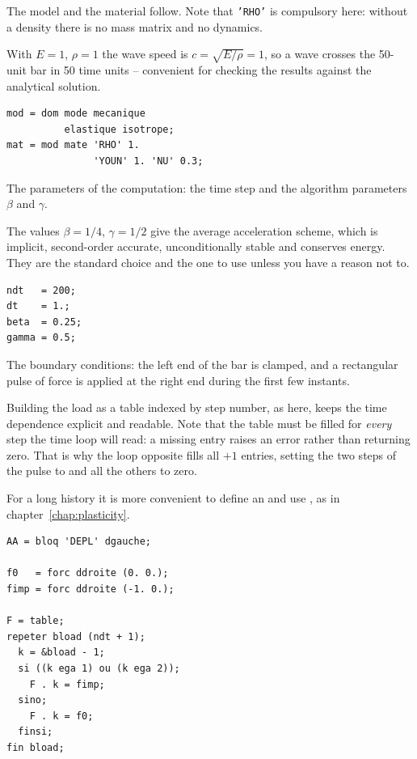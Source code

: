 \begin{castemcom}
The model and the material follow. Note that \texttt{'RHO'} is compulsory
here: without a density there is no mass matrix and no dynamics.

With $E=1$, $\rho=1$ the wave speed is $c=\sqrt{E/\rho}=1$, so a wave crosses
the 50-unit bar in 50 time units -- convenient for checking the results
against the analytical solution.
\end{castemcom}
\begin{castemlines}
\begin{verbatim}
mod = dom mode mecanique
          elastique isotrope;
mat = mod mate 'RHO' 1.
               'YOUN' 1. 'NU' 0.3;
\end{verbatim}
\end{castemlines}

\begin{castemcom}
The parameters of the computation: the time step  and the algorithm
parameters $\beta$ and $\gamma$.

The values $\beta=1/4$, $\gamma=1/2$ give the average acceleration scheme,
which is implicit, second-order accurate, unconditionally stable and
conserves energy. They are the standard choice and the one to use unless you
have a reason not to.
\end{castemcom}
\begin{castemlines}
\begin{verbatim}
ndt   = 200;
dt    = 1.;
beta  = 0.25;
gamma = 0.5;
\end{verbatim}
\end{castemlines}

\begin{castemcom}
The boundary conditions: the left end of the bar is clamped, and a rectangular
pulse of force is applied at the right end during the first few instants.

Building the load as a table indexed by step number, as here, keeps the time
dependence explicit and readable. Note that the table must be filled for \emph{every} step the time loop will
read: a missing entry raises an error rather than returning zero. That is why
the loop opposite fills all $+1$ entries, setting the two steps of
the pulse to  and all the others to zero.

%
For a long history it is more convenient to define an  and use
, as in chapter~\ref{chap:plasticity}.
\end{castemcom}
\begin{castemlines}
\begin{verbatim}
AA = bloq 'DEPL' dgauche;

f0   = forc ddroite (0. 0.);
fimp = forc ddroite (-1. 0.);

F = table;
repeter bload (ndt + 1);
  k = &bload - 1;
  si ((k ega 1) ou (k ega 2));
    F . k = fimp;
  sino;
    F . k = f0;
  finsi;
fin bload;
\end{verbatim}
\end{castemlines}


